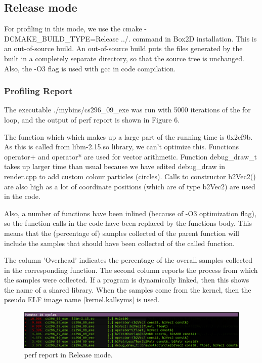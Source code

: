 \documentclass[pdftex,12pt,a4paper]{article}
\begin{document}
\subsection{Release mode}
\par{For profiling in this mode, we use the cmake -DCMAKE\_BUILD\_TYPE=Release ../. command in Box2D installation. This is an out-of-source build.  An out-of-source build puts the files generated by the built in a completely separate directory, so that the source tree is unchanged. Also, the -O3 flag is used with gcc in code compilation.}

\subsubsection{Profiling Report}

\par{The executable ./mybins/cs296\_09\_exe was run with 5000 iterations of the for loop, and the output of perf report is shown in Figure 6.}

\par{The function which which makes up a large part of the running time is 0x2cf9b. As this is called from libm-2.15.so library, we can't optimize this. Functions operator+ and operator* are used for vector arithmetic. Function debug\_draw\_t takes up larger time than usual because we have edited debug\_draw in render.cpp to add custom colour particles (circles). Calls to constructor b2Vec2() are also high as a lot of coordinate positions (which are of type b2Vec2) are used in the code.} 

\par{Also, a number of functions have been inlined (because of -O3 optimization flag), so the function calls in the code have been replaced by the functions body. This means that the (percentage of) samples collected of the parent function will include the samples that should have been collected of the called function.}

\par{The column 'Overhead' indicates the percentage of the overall samples collected in the corresponding function. The second column reports the process from which the samples were collected. If a program is dynamically linked, then this shows the name of a shared library. When the samples come from the kernel, then the pseudo ELF image name [kernel.kallsyms] is used.}

\begin{figure}[h!]
\centering
\includegraphics[scale=.43]{../images/release.png}
\caption{perf report in Release mode.}
\end{figure}
\end{document}
